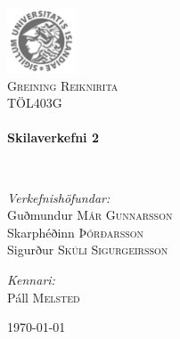 \documentclass{article}
\begin{document}
\begin {titlepage}
\begin{center}
\includegraphics[width=0.15\textwidth]{./Haskoli_Islands_rett.jpg}~\\[1cm]

\textsc{\LARGE Greining Reiknirita}\\[1.5cm]

\textsc{\Large TÖL403G}\\[0.5cm]

\HRule \\[0.4cm]
{ \huge \bfseries Skilaverkefni 2\\[0.4cm] }

\HRule \\[1.5cm]

\begin{minipage}{0.5\textwidth}
\begin{flushleft} \large
\emph{Verkefnishöfundar:}
\\ Guðmundur\textsc{ Már Gunnarsson }
\\ Skarphéðinn \textsc{Þórðarsson}
\\ Sigurður \textsc{Skúli Sigurgeirsson}

\end{flushleft}
\end{minipage}
\begin{minipage}{0.4\textwidth}
\begin{flushright} \large
\emph{Kennari:} \\
Páll \textsc{Melsted}
\end{flushright}
\end{minipage}

\vfill

{\large \today}

\end{center}

\end{titlepage}




\inputminted[mathescape,
               linenos,
               numbersep=5pt,
               gobble=2,
               frame=lines,
               framesep=2mm]{java}{../IntervalTree.java}
\end{document}
